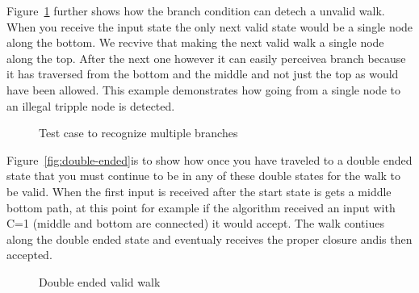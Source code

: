 Figure~\ref{fig:mult-branch} further shows how the branch condition can detech a unvalid walk. When you receive the input state the only next valid state would be a single node along the bottom. We recvive that making the next valid walk a single node along the top. After the next one however it can easily perceivea branch because it has traversed from the bottom and the middle and not just the top as would have been allowed. This example demonstrates how going from a single node to an illegal tripple node is detected.
\begin{figure}
\begin{center}
\end{center}
\caption{Test case to recognize multiple branches}
\label{fig:mult-branch} 
\end{figure}

Figure~\ref{fig:double-ended}is to show how once you have traveled to a double ended state that you must continue to be in any of these double states for the walk to be valid. When the first input is received after the start state is gets a middle bottom path, at this point for example if the algorithm received an input with C=1 (middle and bottom are connected) it would accept. The walk contiues along the double ended state and eventualy receives the proper closure andis then accepted.
\begin{figure}
\begin{center}
\end{center}
\caption{Double ended valid walk}
\label{double-ended}
\end{figure}


